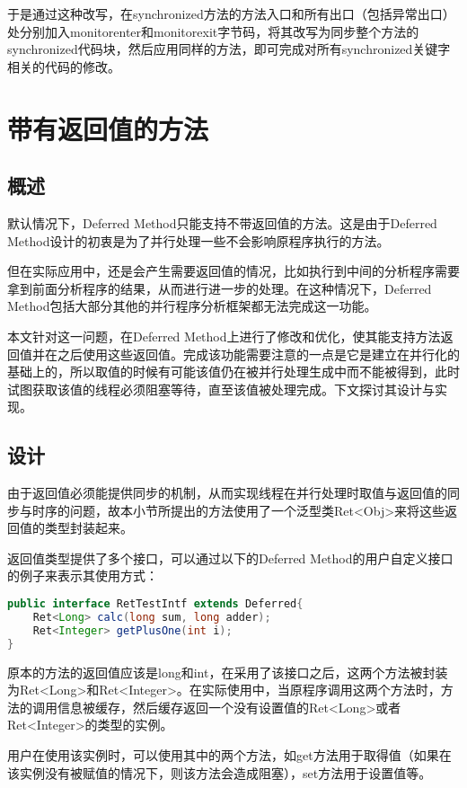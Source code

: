 于是通过这种改写，在synchronized方法的方法入口和所有出口（包括异常出口）处分别加入monitorenter和monitorexit字节码，将其改写为同步整个方法的synchronized代码块，然后应用同样的方法，即可完成对所有synchronized关键字相关的代码的修改。

\section{带有返回值的方法}

\subsection{概述}

默认情况下，Deferred Method只能支持不带返回值的方法。这是由于Deferred Method设计的初衷是为了并行处理一些不会影响原程序执行的方法。

但在实际应用中，还是会产生需要返回值的情况，比如执行到中间的分析程序需要拿到前面分析程序的结果，从而进行进一步的处理。在这种情况下，Deferred Method包括大部分其他的并行程序分析框架都无法完成这一功能。

本文针对这一问题，在Deferred Method上进行了修改和优化，使其能支持方法返回值并在之后使用这些返回值。完成该功能需要注意的一点是它是建立在并行化的基础上的，所以取值的时候有可能该值仍在被并行处理生成中而不能被得到，此时试图获取该值的线程必须阻塞等待，直至该值被处理完成。下文探讨其设计与实现。

\subsection{设计}

由于返回值必须能提供同步的机制，从而实现线程在并行处理时取值与返回值的同步与时序的问题，故本小节所提出的方法使用了一个泛型类Ret<Obj>来将这些返回值的类型封装起来。

返回值类型提供了多个接口，可以通过以下的Deferred Method的用户自定义接口的例子来表示其使用方式：

\begin{lstlisting}[language=Java]
public interface RetTestIntf extends Deferred{ 
	Ret<Long> calc(long sum, long adder);
	Ret<Integer> getPlusOne(int i);
}
\end{lstlisting}

原本的方法的返回值应该是long和int，在采用了该接口之后，这两个方法被封装为Ret<Long>和Ret<Integer>。在实际使用中，当原程序调用这两个方法时，方法的调用信息被缓存，然后缓存返回一个没有设置值的Ret<Long>或者Ret<Integer>的类型的实例。

用户在使用该实例时，可以使用其中的两个方法，如get方法用于取得值（如果在该实例没有被赋值的情况下，则该方法会造成阻塞），set方法用于设置值等。

